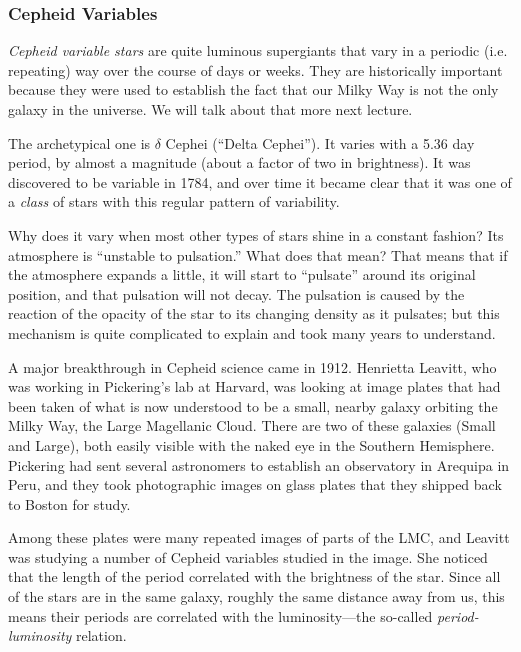 \documentclass[12pt, preprint]{aastex}
\begin{document}
\subsubsection{Cepheid Variables}

{\it Cepheid variable stars} are quite luminous supergiants that vary
in a periodic (i.e. repeating) way over the course of days or
weeks. They are historically important because they were used to
establish the fact that our Milky Way is not the only galaxy in the
universe.  We will talk about that more next lecture.

The archetypical one is $\delta$ Cephei (``Delta Cephei''). It varies
with a 5.36 day period, by almost a magnitude (about a factor of two
in brightness). It was discovered to be variable in 1784, and over
time it became clear that it was one of a {\it class} of stars with
this regular pattern of variability.

Why does it vary when most other types of stars shine in a constant
fashion? Its atmosphere is ``unstable to pulsation.'' What does that
mean? That means that if the atmosphere expands a little, it will
start to ``pulsate'' around its original position, and that pulsation
will not decay. The pulsation is caused by the reaction of the opacity
of the star to its changing density as it pulsates; but this mechanism
is quite complicated to explain and took many years to understand. 

A major breakthrough in Cepheid science came in 1912. Henrietta
Leavitt, who was working in Pickering's lab at Harvard, was looking at
image plates that had been taken of what is now understood to be a
small, nearby galaxy orbiting the Milky Way, the Large Magellanic
Cloud. There are two of these galaxies (Small and Large), both easily
visible with the naked eye in the Southern Hemisphere. Pickering had
sent several astronomers to establish an observatory in Arequipa in
Peru, and they took photographic images on glass plates that they
shipped back to Boston for study.

Among these plates were many repeated images of parts of the LMC, and
Leavitt was studying a number of Cepheid variables studied in the
image. She noticed that the length of the period correlated with the
brightness of the star. Since all of the stars are in the same galaxy,
roughly the same distance away from us, this means their periods are
correlated with the luminosity---the so-called {\it period-luminosity}
relation. 
\end{document}
